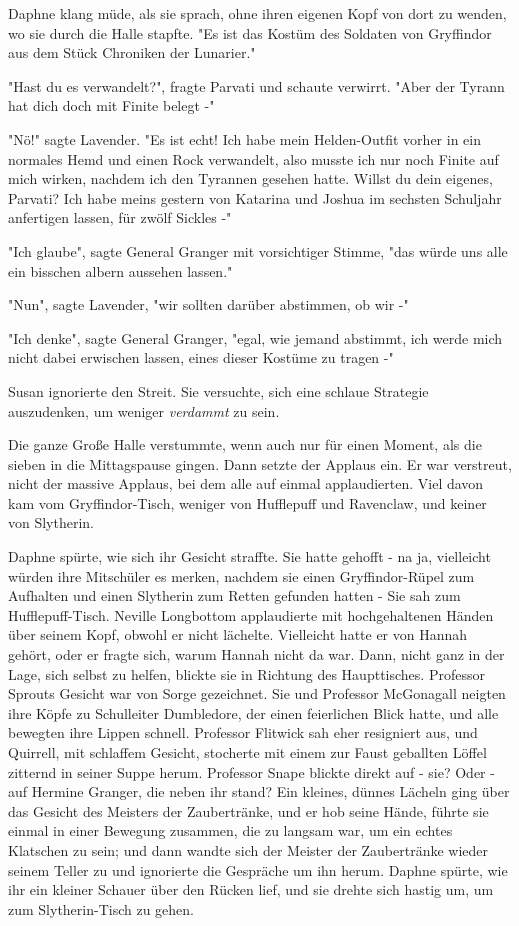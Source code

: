 {Daphne klang müde, als sie sprach, ohne ihren eigenen Kopf von dort zu wenden, wo sie durch die Halle stapfte. "Es ist das Kostüm des Soldaten von Gryffindor aus dem Stück Chroniken der Lunarier."

"Hast du es verwandelt?", fragte Parvati und schaute verwirrt. "Aber der Tyrann hat dich doch mit Finite belegt -"

"Nö!" sagte Lavender. "Es ist echt! Ich habe mein Helden-Outfit vorher in ein normales Hemd und einen Rock verwandelt, also musste ich nur noch Finite auf mich wirken, nachdem ich den Tyrannen gesehen hatte. Willst du dein eigenes, Parvati? Ich habe meins gestern von Katarina und Joshua im sechsten Schuljahr anfertigen lassen, für zwölf Sickles -"

"Ich glaube", sagte General Granger mit vorsichtiger Stimme, "das würde uns alle ein bisschen albern aussehen lassen."

"Nun", sagte Lavender, "wir sollten darüber abstimmen, ob wir -"

"Ich denke", sagte General Granger, "egal, wie jemand abstimmt, ich werde mich nicht dabei erwischen lassen, eines dieser Kostüme zu tragen -"

Susan ignorierte den Streit. Sie versuchte, sich eine schlaue Strategie auszudenken, um weniger \emph{verdammt} zu sein.

Die ganze Große Halle verstummte, wenn auch nur für einen Moment, als die sieben in die Mittagspause gingen. Dann setzte der Applaus ein. Er war verstreut, nicht der massive Applaus, bei dem alle auf einmal applaudierten. Viel davon kam vom Gryffindor-Tisch, weniger von Hufflepuff und Ravenclaw, und keiner von Slytherin.

Daphne spürte, wie sich ihr Gesicht straffte. Sie hatte gehofft - na ja, vielleicht würden ihre Mitschüler es merken, nachdem sie einen Gryffindor-Rüpel zum Aufhalten und einen Slytherin zum Retten gefunden hatten - Sie sah zum Hufflepuff-Tisch. Neville Longbottom applaudierte mit hochgehaltenen Händen über seinem Kopf, obwohl er nicht lächelte. Vielleicht hatte er von Hannah gehört, oder er fragte sich, warum Hannah nicht da war. Dann, nicht ganz in der Lage, sich selbst zu helfen, blickte sie in Richtung des Haupttisches. Professor Sprouts Gesicht war von Sorge gezeichnet. Sie und Professor McGonagall neigten ihre Köpfe zu Schulleiter Dumbledore, der einen feierlichen Blick hatte, und alle bewegten ihre Lippen schnell. Professor Flitwick sah eher resigniert aus, und Quirrell, mit schlaffem Gesicht, stocherte mit einem zur Faust geballten Löffel zitternd in seiner Suppe herum. Professor Snape blickte direkt auf - sie? Oder - auf Hermine Granger, die neben ihr stand? Ein kleines, dünnes Lächeln ging über das Gesicht des Meisters der Zaubertränke, und er hob seine Hände, führte sie einmal in einer Bewegung zusammen, die zu langsam war, um ein echtes Klatschen zu sein; und dann wandte sich der Meister der Zaubertränke wieder seinem Teller zu und ignorierte die Gespräche um ihn herum. Daphne spürte, wie ihr ein kleiner Schauer über den Rücken lief, und sie drehte sich hastig um, um zum Slytherin-Tisch zu gehen.

}
